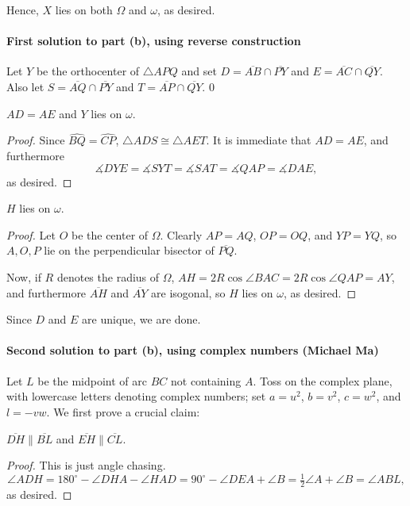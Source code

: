 Hence, $X$ lies on both $\Omega$ and $\omega$, as desired. 

\paragraph{First solution to part (b), using reverse construction}     Let $Y$ be the orthocenter of $\triangle APQ$ and set $D=\overline{AB}\cap\overline{PY}$ and $E=\overline{AC}\cap\overline{QY}$. Also let $S=\overline{AQ}\cap\overline{PY}$ and $T=\overline{AP}\cap\overline{QY}$.
\setcounter{claim}0
\begin{claim}
    $AD=AE$ and $Y$ lies on $\omega$.
\end{claim}
\begin{proof}
    Since $\widehat{BQ}=\widehat{CP}$, $\triangle ADS\cong\triangle AET$. It is immediate that $AD=AE$, and furthermore \[\measuredangle DYE=\measuredangle SYT=\measuredangle SAT=\measuredangle QAP=\measuredangle DAE,\]
    as desired.
\end{proof}
\begin{claim}
    $H$ lies on $\omega$.
\end{claim}
\begin{proof}
    Let $O$ be the center of $\Omega$. Clearly $AP=AQ$, $OP=OQ$, and $YP=YQ$, so $A,O,P$ lie on the perpendicular bisector of $\overline{PQ}$.

    Now, if $R$ denotes the radius of $\Omega$, $AH=2R\cos\angle BAC=2R\cos\angle QAP=AY$, and furthermore $\overline{AH}$ and $\overline{AY}$ are isogonal, so $H$ lies on $\omega$, as desired.
\end{proof}

Since $D$ and $E$ are unique, we are done. 

\paragraph{Second solution to part (b), using complex numbers (Michael Ma)}     Let $L$ be the midpoint of arc $\widehat{BC}$ not containing $A$. Toss on the complex plane, with lowercase letters denoting complex numbers; set $a=u^2$, $b=v^2$, $c=w^2$, and $l=-vw$. We first prove a crucial claim:
\begin{claim*}
    $\overline{DH}\parallel\overline{BL}$ and $\overline{EH}\parallel\overline{CL}$.
\end{claim*}
\begin{proof}
    This is just angle chasing. \[\angle ADH=180^\circ-\angle DHA-\angle HAD=90^\circ-\angle DEA+\angle B=\tfrac12\angle A+\angle B=\angle ABL,\]
    as desired.
\end{proof}

